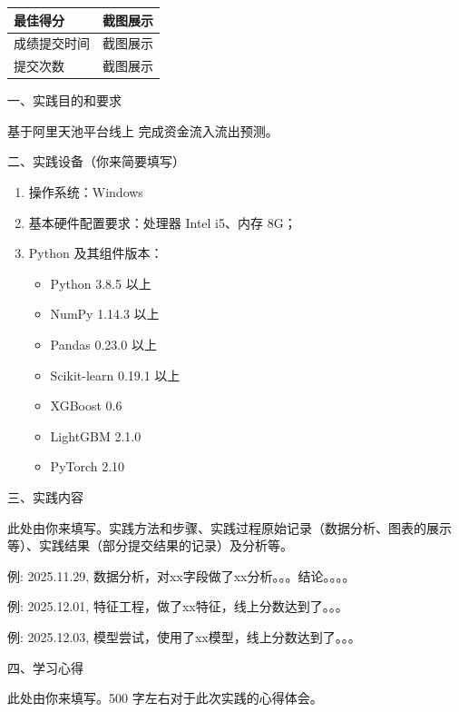 \documentclass[12pt,a4paper]{article}
\begin{document}
{\songti

{\songti
\renewcommand{\arraystretch}{1.4}
\begin{center}
\begin{tabular}{|>{\centering\arraybackslash}p{6cm}|>{\centering\arraybackslash}p{8cm}|}
    \hline
    最佳得分 &
    \begin{minipage}[c]{8cm}
        \centering
        截图展示
    \end{minipage}
    \\ \hline
    成绩提交时间       & 截图展示 \\ \hline
    提交次数      &  截图展示 \\ \hline
\end{tabular}
\end{center}
}

\vspace{0.8cm}

\noindent 一、实践目的和要求

\noindent 基于阿里天池平台线上 完成资金流入流出预测。

\vspace{0.5cm}

\noindent 二、实践设备（你来简要填写）

\begin{enumerate}
  \item 操作系统：Windows
  \item 基本硬件配置要求：处理器 Intel i5、内存 8G；
  \item Python 及其组件版本：
  \begin{itemize}
    \item Python 3.8.5 以上
    \item NumPy 1.14.3 以上
    \item Pandas 0.23.0 以上
    \item Scikit-learn 0.19.1 以上
    \item XGBoost 0.6
    \item LightGBM 2.1.0
    \item PyTorch 2.10
  \end{itemize}
\end{enumerate}

\vspace{0.5cm}

\noindent 三、实践内容

\noindent 此处由你来填写。实践方法和步骤、实践过程原始记录（数据分析、图表的展示等）、实践结果（部分提交结果的记录）及分析等。


例: 2025.11.29, 数据分析，对xx字段做了xx分析。。。结论。。。。


例: 2025.12.01, 特征工程，做了xx特征，线上分数达到了。。。


例: 2025.12.03, 模型尝试，使用了xx模型，线上分数达到了。。。


\vspace{0.5cm}

\noindent 四、学习心得

\noindent 此处由你来填写。500 字左右对于此次实践的心得体会。

} %
\end{document}
